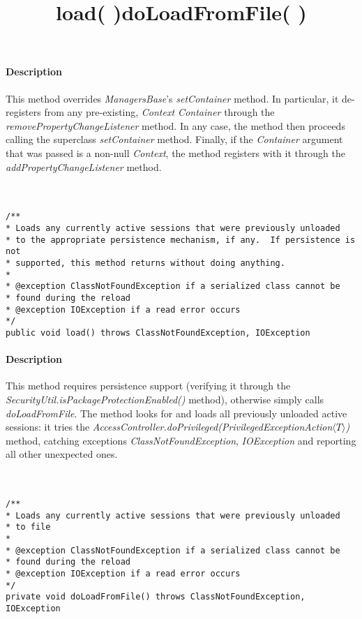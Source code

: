 \paragraph{Description} This method overrides \textit{ManagersBase}'s \textit{setContainer} method. In particular, it de-registers from any pre-existing, \textit{Context Container} through the \textit{removePropertyChangeListener} method. In any case, the method then proceeds calling the superclass \textit{setContainer} method. Finally, if the \textit{Container} argument that was passed is a non-null \textit{Context}, the method registers with it through the \textit{addPropertyChangeListener} method.\\\\\\


\title{{\large \textbf{load( )}}}
\lstset{firstnumber=426}
\begin{lstlisting}
/**
* Loads any currently active sessions that were previously unloaded
* to the appropriate persistence mechanism, if any.  If persistence is not
* supported, this method returns without doing anything.
*
* @exception ClassNotFoundException if a serialized class cannot be
* found during the reload
* @exception IOException if a read error occurs
*/
public void load() throws ClassNotFoundException, IOException
\end{lstlisting}

\paragraph{Description} This method requires persistence support (verifying it through the \textit{SecurityUtil.isPackageProtectionEnabled()} method), otherwise simply calls \textit{doLoadFromFile}. The method looks for and loads all previously unloaded active sessions: it tries the \textit{AccessController.doPrivileged(PrivilegedExceptionAction$\langle T \rangle$)} method, catching exceptions \textit{ClassNotFoundException}, \textit{IOException} and reporting all other unexpected ones. \\\\\\


\title{{\large \textbf{doLoadFromFile( )}}}
\lstset{firstnumber=457}
\begin{lstlisting}
/**
* Loads any currently active sessions that were previously unloaded
* to file
*
* @exception ClassNotFoundException if a serialized class cannot be
* found during the reload
* @exception IOException if a read error occurs
*/
private void doLoadFromFile() throws ClassNotFoundException, IOException 
\end{lstlisting}

